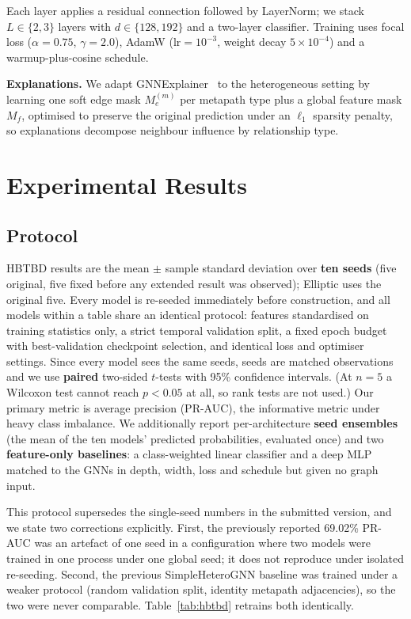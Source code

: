 \documentclass[conference]{IEEEtran}
\begin{document}
Each layer applies a residual connection followed by LayerNorm; we stack
$L\in\{2,3\}$ layers with $d\in\{128,192\}$ and a two-layer classifier.
Training uses focal loss ($\alpha=0.75$, $\gamma=2.0$), AdamW
($\text{lr}=10^{-3}$, weight decay $5\times10^{-4}$) and a warmup-plus-cosine
schedule.

\textbf{Explanations.} We adapt GNNExplainer~\cite{ying2019} to the
heterogeneous setting by learning one soft edge mask $M_e^{(m)}$ per metapath
type plus a global feature mask $M_f$, optimised to preserve the original
prediction under an $\ell_1$ sparsity penalty, so explanations decompose
neighbour influence by relationship type.

\section{Experimental Results}

\subsection{Protocol}
\label{sec:protocol}

HBTBD results are the mean $\pm$ sample standard deviation over \textbf{ten
seeds} (five original, five fixed before any extended result was observed);
Elliptic uses the original five. Every model is re-seeded immediately before
construction, and all models within a table share an identical protocol:
features standardised on training statistics only, a strict temporal
validation split, a fixed epoch budget with best-validation checkpoint
selection, and identical loss and optimiser settings. Since every model sees
the same seeds, seeds are matched observations and we use \textbf{paired}
two-sided $t$-tests with 95\% confidence intervals. (At $n=5$ a Wilcoxon test
cannot reach $p<0.05$ at all, so rank tests are not used.) Our primary metric
is average precision (PR-AUC), the informative metric under heavy class
imbalance. We additionally report per-architecture \textbf{seed ensembles}
(the mean of the ten models' predicted probabilities, evaluated once) and two
\textbf{feature-only baselines}: a class-weighted linear classifier and a
deep MLP matched to the GNNs in depth, width, loss and schedule but given no
graph input.

This protocol supersedes the single-seed numbers in the submitted version,
and we state two corrections explicitly. First, the previously reported
69.02\% PR-AUC was an artefact of one seed in a configuration where two
models were trained in one process under one global seed; it does not
reproduce under isolated re-seeding. Second, the previous SimpleHeteroGNN
baseline was trained under a weaker protocol (random validation split,
identity metapath adjacencies), so the two were never comparable.
Table~\ref{tab:hbtbd} retrains both identically.
\end{document}

